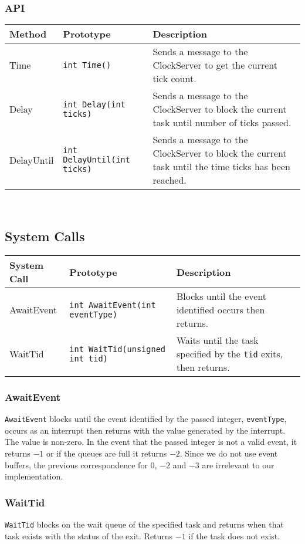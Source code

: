 \documentclass[12pt]{article}
\begin{document}
\subsubsection{API}
\begin{tabular}{|l|l|p{}|}
  \hline
  {\bf Method} & {\bf Prototype} & {\bf Description} \\\hline
  Time & \texttt{int Time()} & Sends a message to the ClockServer to get the current tick count. \\\hline
  Delay & \texttt{int Delay(int ticks)} & Sends a message to the ClockServer to block the current task until number of ticks passed. \\\hline
  DelayUntil & \texttt{int DelayUntil(int ticks)} & Sends a message to the ClockServer to block the current task until the time ticks has been reached. \\\hline
\end{tabular}
\\[1\baselineskip]

\subsection{System Calls}
\begin{tabular}{|l|l|p{}|}
  \hline
  {\bf System Call} & {\bf Prototype} & {\bf Description} \\\hline
  AwaitEvent & \texttt{int AwaitEvent(int eventType)} & Blocks until the event identified occurs then returns. \\\hline
  WaitTid & \texttt{int WaitTid(unsigned int tid)} & Waits until the task specified by the \texttt{tid} exits, then returns. \\\hline
\end{tabular}
\subsubsection{AwaitEvent}
\texttt{AwaitEvent} blocks until the event identified by the passed integer, \texttt{eventType}, occurs as an interrupt then returns with the value generated by the interrupt.  The value is non-zero.  In the event that the passed integer is not a valid event, it returns $-1$ or if the queues are full it returns $-2$.  Since we do not use event buffers, the previous correspondence for $0$, $-2$ and $-3$ are irrelevant to our implementation.
\\
\subsubsection{WaitTid}
\texttt{WaitTid} blocks on the wait queue of the specified task and returns when that task exists with the status of the exit.  Returns $-1$ if the task does not exist.
\\[2\baselineskip]
\end{document}

